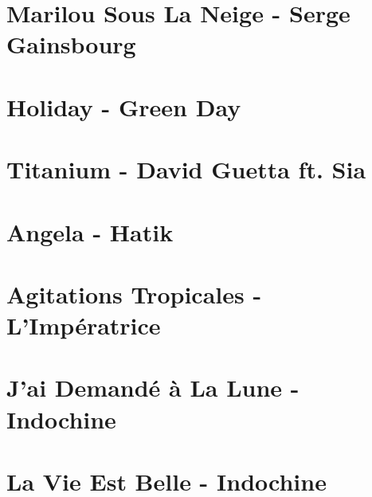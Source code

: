\documentclass{guitartabs}
\begin{document}
\section{Marilou Sous La Neige - Serge Gainsbourg}
\begin{guitar}

\end{guitar}

\section*{Holiday - Green Day}
\begin{guitar}

\end{guitar}

\section{Titanium - David Guetta ft. Sia}
\begin{guitar}

\end{guitar}

\section{Angela - Hatik}
\begin{guitar}

\end{guitar}



\section{Agitations Tropicales - L'Impératrice}




\section*{J'ai Demandé à La Lune - Indochine}
\begin{guitar}

\end{guitar}

\section{La Vie Est Belle - Indochine}
\begin{guitar}

\end{guitar}
\end{document}
